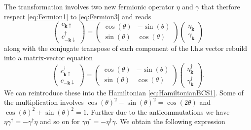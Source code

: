 \documentclass[../main.tex]{subfile}
\begin{document}
The transformation involves two new fermionic operator $\eta$ and $\gamma$ that therfore respect \ref{eq:Fermion1} to \ref{eq:Fermion3} and reads
\begin{equation}\label{eq:RotationBasis_c1}
    \begin{pmatrix}
        c_{\bm{k}\uparrow}\\
        c_{-\bm{k}\downarrow}^{\dagger}
    \end{pmatrix} = 
    \begin{pmatrix}
        \cos(\theta) & -\sin(\theta)\\
        \sin(\theta) & \cos(\theta)
    \end{pmatrix}
    \begin{pmatrix}
        \eta_{\bm{k}}\\
        \gamma_{\bm{k}}
    \end{pmatrix}
\end{equation}
along with the conjugate transpose of each component of the l.h.s vector rebuild into a matrix-vector equation
\begin{equation}\label{eq:RotationBasis_c2}
    \begin{pmatrix}
        c_{\bm{k}\uparrow}^{\dagger} \\
        c_{-\bm{k}\downarrow}
    \end{pmatrix} = 
    \begin{pmatrix}
        \cos(\theta) & -\sin(\theta)\\
        \sin(\theta) & \cos(\theta)
    \end{pmatrix}
    \begin{pmatrix}
        \eta_{\bm{k}}^{\dagger} \\
        \gamma_{\bm{k}}^{\dagger}
    \end{pmatrix}.
\end{equation}
We can reintroduce these into the Hamiltonian \ref{eq:HamiltonianBCS1}. 
Some of the multiplication involves $\cos(\theta)^2 - \sin(\theta)^2 = \cos(2\theta)$ and $\cos(\theta)^2 + \sin(\theta)^2 = 1$. 
Further due to the anticommutations we have $\eta \gamma^{\dagger} = - \gamma^{\dagger}\eta$ and so on for $\gamma \eta^{\dagger} = - \eta^{\dagger}\gamma$.
We obtain the following expression
\end{document}
